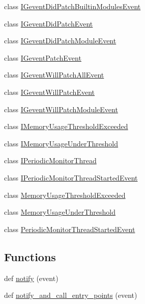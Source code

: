 \begin{DoxyCompactItemize}
\item 
class \hyperlink{classgevent_1_1events_1_1_i_gevent_did_patch_builtin_modules_event}{I\+Gevent\+Did\+Patch\+Builtin\+Modules\+Event}
\item 
class \hyperlink{classgevent_1_1events_1_1_i_gevent_did_patch_event}{I\+Gevent\+Did\+Patch\+Event}
\item 
class \hyperlink{classgevent_1_1events_1_1_i_gevent_did_patch_module_event}{I\+Gevent\+Did\+Patch\+Module\+Event}
\item 
class \hyperlink{classgevent_1_1events_1_1_i_gevent_patch_event}{I\+Gevent\+Patch\+Event}
\item 
class \hyperlink{classgevent_1_1events_1_1_i_gevent_will_patch_all_event}{I\+Gevent\+Will\+Patch\+All\+Event}
\item 
class \hyperlink{classgevent_1_1events_1_1_i_gevent_will_patch_event}{I\+Gevent\+Will\+Patch\+Event}
\item 
class \hyperlink{classgevent_1_1events_1_1_i_gevent_will_patch_module_event}{I\+Gevent\+Will\+Patch\+Module\+Event}
\item 
class \hyperlink{classgevent_1_1events_1_1_i_memory_usage_threshold_exceeded}{I\+Memory\+Usage\+Threshold\+Exceeded}
\item 
class \hyperlink{classgevent_1_1events_1_1_i_memory_usage_under_threshold}{I\+Memory\+Usage\+Under\+Threshold}
\item 
class \hyperlink{classgevent_1_1events_1_1_i_periodic_monitor_thread}{I\+Periodic\+Monitor\+Thread}
\item 
class \hyperlink{classgevent_1_1events_1_1_i_periodic_monitor_thread_started_event}{I\+Periodic\+Monitor\+Thread\+Started\+Event}
\item 
class \hyperlink{classgevent_1_1events_1_1_memory_usage_threshold_exceeded}{Memory\+Usage\+Threshold\+Exceeded}
\item 
class \hyperlink{classgevent_1_1events_1_1_memory_usage_under_threshold}{Memory\+Usage\+Under\+Threshold}
\item 
class \hyperlink{classgevent_1_1events_1_1_periodic_monitor_thread_started_event}{Periodic\+Monitor\+Thread\+Started\+Event}
\end{DoxyCompactItemize}
\subsection*{Functions}
\begin{DoxyCompactItemize}
\item 
def \hyperlink{namespacegevent_1_1events_af0e705f2d952ae6508308d14be2fa3a2}{notify} (event)
\item 
def \hyperlink{namespacegevent_1_1events_a1138bb5ebc2cd515da4e690c87ce2c69}{notify\+\_\+and\+\_\+call\+\_\+entry\+\_\+points} (event)
\end{DoxyCompactItemize}
